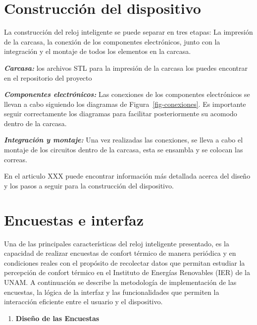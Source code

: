 \documentclass[
  12pt,
  letterpaper,
  DIV=11,
  numbers=noendperiod]{scrreport}
\providecommand{\tightlist}{%
  \setlength{\itemsep}{0pt}\setlength{\parskip}{0pt}}\usepackage{longtable,booktabs,array}
\begin{document}
\hypertarget{sec-construccion}{%
\section{Construcción del dispositivo}\label{sec-construccion}}

La construcción del reloj inteligente se puede separar en tres etapas:
La impresión de la carcasa, la conexión de los componentes electrónicos,
junto con la integración y el montaje de todos los elementos en la
carcasa.

\textbf{\emph{Carcasa:}} los archivos STL para la impresión de la
carcasa los puedes encontrar en el repositorio del proyecto

\textbf{\emph{Componentes electrónicos:}} Las conexiones de los
componentes electrónicos se llevan a cabo siguiendo los diagramas de
Figura~\ref{fig-conexiones}. Es importante seguir correctamente los
diagramas para facilitar posteriormente su acomodo dentro de la carcasa.

\textbf{\emph{Integración y montaje:}} Una vez realizadas las
conexiones, se lleva a cabo el montaje de los circuitos dentro de la
carcasa, esta se ensambla y se colocan las correas.

En el articulo XXX puede encontrar información más detallada acerca del
diseño y los pasos a seguir para la construcción del dispositivo.

\hypertarget{sec-encuestas}{%
\section{Encuestas e interfaz}\label{sec-encuestas}}

Una de las principales características del reloj inteligente presentado,
es la capacidad de realizar encuestas de confort térmico de manera
periódica y en condiciones reales con el propósito de recolectar datos
que permitan estudiar la percepción de confort térmico en el Instituto
de Energías Renovables (IER) de la UNAM. A continuación se describe la
metodología de implementación de las encuestas, la lógica de la interfaz
y las funcionalidades que permiten la interacción eficiente entre el
usuario y el dispositivo.

\begin{enumerate}
\def\labelenumi{\arabic{enumi}.}
\tightlist
\item
  \textbf{Diseño de las Encuestas}
\end{enumerate}
\end{document}

